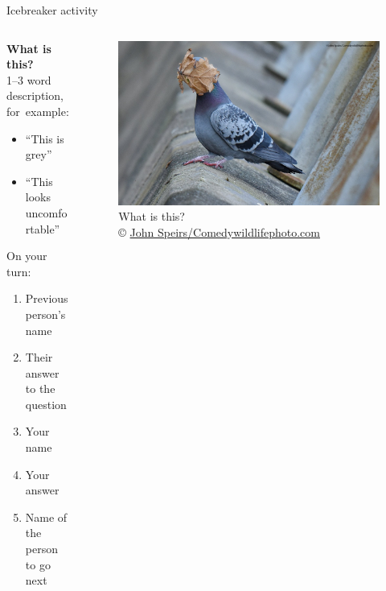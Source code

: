 \documentclass[
  ignorenonframetext,
]{beamer}
\providecommand{\tightlist}{%
  \setlength{\itemsep}{0pt}\setlength{\parskip}{0pt}}
\begin{document}
\begin{frame}{ Icebreaker activity}
\protect\hypertarget{icebreaker-activity}{}
\begin{columns}[T]
\begin{column}{0.5\textwidth}
\textbf{What is this?}\\
1--3 word description, for~example:

\begin{itemize}
\tightlist
\item
  ``This is grey''
\item
  ``This looks uncomfortable''
\end{itemize}

\hfill\break
On your turn:

\begin{enumerate}
\item
  Previous person's name
\item
  Their answer to the question
\item
  Your name
\item
  Your answer
\item
  Name of the person to go next
\end{enumerate}
\end{column}

\begin{column}{0.5\textwidth}
\begin{figure}
\centering
\includegraphics[width=1\textwidth,height=\textheight]{images/john-speirs_i-guess-summers-over.jpg}
\caption{What is this?\\
©
\href{https://www.comedywildlifephoto.com/gallery/comedy-wildlife-2021-competition-winners.php}{John
Speirs/Comedywildlifephoto.com}}
\end{figure}
\end{column}
\end{columns}
\end{frame}
\end{document}
